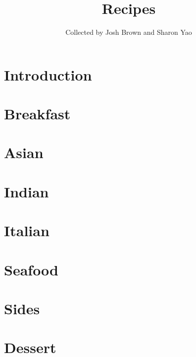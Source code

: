 \documentclass[twoside, 10pt]{book}
\title{\bf \Huge Recipes}
\author{Collected by Josh Brown and Sharon Yao}
\date{}
\begin{document}
\maketitle
\tableofcontents{}

\chapter*{Introduction}
    

\chapter{Breakfast}
    
    
    
    
    
    

\chapter{Asian}
    
    
    
    

\chapter{Indian}
    
    
    
    

\chapter{Italian}
    
    

\chapter{Seafood}
    
    
    
    
    
    
    

\chapter{Sides}
    
    
    

\chapter{Dessert}
    
    
    
    
    
    
    
\end{document}
